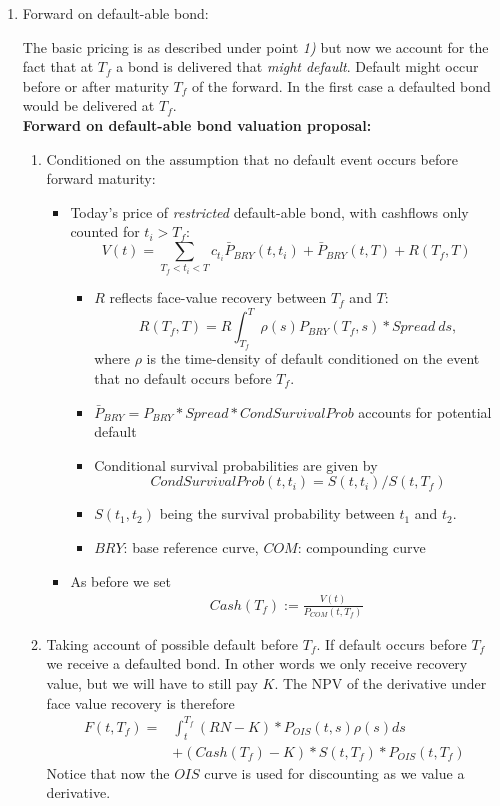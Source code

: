 \begin{enumerate}
\item Forward on default-able bond:

The basic pricing is as described under point \emph{1)} but now we account for the fact that at $T_f$ a bond is delivered that \emph{might default}. Default might occur before or after maturity $T_f$ of the forward. In the first case a defaulted bond would be delivered at $T_f$.\\

\textbf{Forward on default-able bond valuation proposal:}
%
%
\begin{enumerate}
	\item Conditioned on the assumption that no default event occurs before forward maturity:
	\begin{itemize}
		\item Today's price of \emph{restricted} default-able bond, with cashflows only counted for $t_i>T_f$:
		$$V(t)=\sum_{ T_f<t_i<T}c_{t_i}{\bar{P}_{BRY}}(t,t_i)+\bar{P}_{BRY}(t,T)+R(T_f,T)$$
		\begin{itemize}
			\item $R$ reflects face-value recovery between $T_f$ and $T$: $$R(T_f,T)=R\int_{T_f}^T\rho(s){P}_{BRY}(T_f,s)*Spread\ d s,$$ where $\rho$ is the time-density of default conditioned on the event that no default occurs before $T_f$.
			\item $\bar{P}_{BRY}=P_{BRY}*Spread*CondSurvivalProb$ accounts for potential default 
			\item Conditional survival probabilities are given by $$CondSurvivalProb(t,t_i)=S(t,t_i)/S(t,T_f)$$
			\item $S(t_1,t_2)$ being the survival probability between $t_1$ and $t_2$.
			\item $BRY$: base reference curve, $COM$: compounding curve
		\end{itemize}
		\item As before we set
		 \begin{align*}
		Cash(T_f):=\frac{V(t)}{{P}_{COM}(t,T_f)}
		\end{align*}
	\end{itemize}
	
	\item Taking account of possible default before $T_f$. If default occurs before $T_f$ we receive a defaulted bond. In other words we only receive recovery value, but we will have to still pay $K$. The NPV of the derivative under face value recovery is therefore
	\begin{align*}
	F(t,T_f)=&\int_{t}^{T_f}(RN-K)*P_{OIS}(t,s)\rho(s)d s\\
	&+ (Cash(T_f)-K)*S(t,T_f)*P_{OIS}(t,T_f)
	\end{align*}
	Notice that now the $OIS$ curve is used for discounting as we value a derivative.
	
\end{enumerate}

\end{enumerate}

